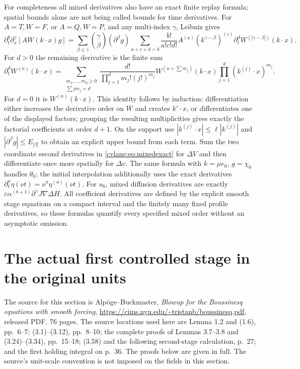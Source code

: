 For completeness all mixed derivatives also have an exact finite
replay formula; spatial bounds alone are not being called bounds for
time derivatives. For $A=T,W=F$, or $A=Q,W=P$, and any multi-index
$\gamma$, Leibniz gives
\begin{equation}
 \partial_t^b\partial_x^\gamma[AW(k\cdot x)g]
 =\sum_{\beta\leq\gamma}\binom\gamma\beta(\partial^\beta g)
 \sum_{a+c+d=b}\frac{b!}{a!c!d!}A^{(a)}
 (k^{\gamma-\beta})^{(c)}\partial_t^d
 W^{(|\gamma-\beta|)}(k\cdot x).
 \label{cvlane:eq:mixedexact}
\end{equation}
For $d>0$ the remaining derivative is the finite sum
\[
 \partial_t^d W^{(n)}(k\cdot x)=
 \sum_{\substack{m_1,\ldots,m_d\geq0\\\sum j m_j=d}}
 \frac{d!}{\prod_{j=1}^d m_j!(j!)^{m_j}}
 W^{(n+\sum m_j)}(k\cdot x)
 \prod_{j=1}^d(k^{(j)}\cdot x)^{m_j}.
\]
For $d=0$ it is $W^{(n)}(k\cdot x)$. This identity follows by
induction: differentiation either increases the derivative order
on $W$ and creates $k'\cdot x$, or differentiates one of the
displayed factors; grouping the resulting multiplicities gives
exactly the factorial coefficients at order $d+1$.
On the support use $|k^{(j)}\cdot x|\leq\ell|k^{(j)}|$ and
$|\partial^\beta g|\leq E_{|\beta|}$ to obtain an explicit
upper bound from each term. Sum the two coordinate second
derivatives in \eqref{cvlane:eq:mixedexact} for $\Delta V$ and then
differentiate once more spatially for $\Delta v$. The same formula
with $k=\mu e_0$, $g=\chi_0$ handles $\theta_0$; the initial
interpolation additionally uses the exact derivatives
$\partial_t^a\eta(\nu t)=\nu^a\eta^{(a)}(\nu t)$.
For $u_b$, mixed diffusion derivatives are exactly
$\varepsilon\alpha^{(b+1)}\partial^\gamma J\nabla\Delta H$.
All coefficient derivatives are defined by the explicit smooth
stage equations on a compact interval and the finitely many fixed
profile derivatives, so these formulas quantify every specified
mixed order without an asymptotic omission.


\section{The actual first controlled stage in the original units}
\label{cvlane:sec:cv-first-stage}

The source for this section is Alp\"oge--Buckmaster,
\emph{Blowup for the Boussinesq equations with smooth forcing},
\url{https://cims.nyu.edu/~tristanb/boussinesq.pdf}, released PDF,
76 pages. The source locations used here are Lemma 1.2 and (1.6),
pp.~6--7; (3.1)--(3.12), pp.~8--10; the complete proofs of
Lemmas 3.7--3.8 and (3.24)--(3.34), pp.~15--18;
(3.58) and the following second-stage calculation, p.~27; and
the first holding integral on p.~36. The proofs below are given in
full. The source's unit-scale convention is not imposed on the fields
in this section.

